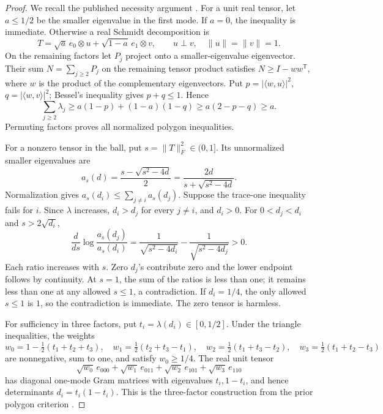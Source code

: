 \documentclass[11pt]{article}
\newcommand{\lam}{\lambda}
\begin{document}
\begin{proof}
We recall the published necessity argument \cite{HSS}. For a unit real tensor, let \(a\leq1/2\) be the smaller eigenvalue in the first mode. If \(a=0\), the inequality is immediate. Otherwise a real Schmidt decomposition is
\[
 T=\sqrt a\,e_0\otimes u+\sqrt{1-a}\,e_1\otimes v,\qquad
 u\perp v,\quad \|u\|=\|v\|=1.
\]
On the remaining factors let \(P_j\) project onto a smaller-eigenvalue eigenvector. Their sum \(N=\sum_{j\geq2}P_j\) on the remaining tensor product satisfies \(N\geq I-ww^{\mathsf T}\), where \(w\) is the product of the complementary eigenvectors. Put \(p=|\langle w,u\rangle|^2\), \(q=|\langle w,v\rangle|^2\); Bessel's inequality gives \(p+q\leq1\). Hence
\[
 \sum_{j\geq2}\lam_j
 \geq a(1-p)+(1-a)(1-q)
 \geq a(2-p-q)\geq a.
\]
Permuting factors proves all normalized polygon inequalities.

For a nonzero tensor in the ball, put \(s=\|T\|_F^2\in(0,1]\). Its unnormalized smaller eigenvalues are
\[
 a_s(d)=\frac{s-\sqrt{s^2-4d}}2
       =\frac{2d}{s+\sqrt{s^2-4d}}.
\]
Normalization gives \(a_s(d_i)\leq\sum_{j\ne i}a_s(d_j)\).
Suppose the trace-one inequality fails for \(i\). Since \(\lam\) increases, \(d_i>d_j\) for every \(j\ne i\), and \(d_i>0\). For \(0<d_j<d_i\) and \(s>2\sqrt{d_i}\),
\[
 \frac{d}{ds}\log\frac{a_s(d_j)}{a_s(d_i)}
 =\frac1{\sqrt{s^2-4d_i}}-\frac1{\sqrt{s^2-4d_j}}>0.
\]
Each ratio increases with \(s\). Zero \(d_j\)'s contribute zero and the lower endpoint follows by continuity. At \(s=1\), the sum of the ratios is less than one; it remains less than one at any allowed \(s\leq1\), a contradiction. If \(d_i=1/4\), the only allowed \(s\leq1\) is \(1\), so the contradiction is immediate. The zero tensor is harmless.

For sufficiency in three factors, put \(t_i=\lam(d_i)\in[0,1/2]\). Under the triangle inequalities, the weights
\[
 w_0=1-\tfrac12(t_1+t_2+t_3),\quad
 w_1=\tfrac12(t_2+t_3-t_1),\quad
 w_2=\tfrac12(t_1+t_3-t_2),\quad
 w_3=\tfrac12(t_1+t_2-t_3)
\]
are nonnegative, sum to one, and satisfy \(w_0\geq1/4\).
The real unit tensor
\[
 \sqrt{w_0}\,e_{000}+\sqrt{w_1}\,e_{011}
 +\sqrt{w_2}\,e_{101}+\sqrt{w_3}\,e_{110}
\]
has diagonal one-mode Gram matrices with eigenvalues \(t_i,1-t_i\), and hence determinants \(d_i=t_i(1-t_i)\). This is the three-factor construction from the prior polygon criterion \cite{HSS}.
\end{proof}
\end{document}

